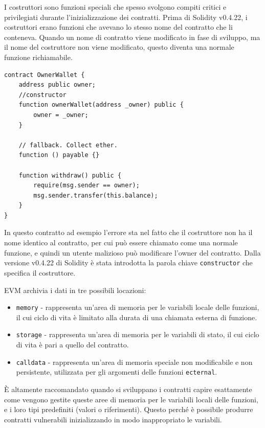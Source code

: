 I costruttori sono funzioni speciali che spesso svolgono compiti critici e privilegiati durante l'inizializzazione dei contratti. Prima di Solidity v0.4.22, i costruttori erano funzioni che avevano lo stesso nome del contratto che li conteneva. Quando un nome di contratto viene modificato in fase di sviluppo, ma il nome del costruttore non viene modificato, questo diventa una normale funzione richiamabile.
\begin{lstlisting}
contract OwnerWallet {
    address public owner;
    //constructor
    function ownerWallet(address _owner) public {
        owner = _owner;
    }
    
    // fallback. Collect ether.
    function () payable {} 
    
    function withdraw() public {
        require(msg.sender == owner); 
        msg.sender.transfer(this.balance);
    }
}
\end{lstlisting}
In questo contratto ad esempio l'errore sta nel fatto che il costruttore non ha il nome identico al contratto, per cui può essere chiamato come una normale funzione, e quindi un utente malizioso può modificare l'owner del contratto. Dalla versione v0.4.22 di Solidity è stata introdotta la parola chiave \texttt{constructor} che specifica il costruttore. 

\vspace{5mm}

EVM archivia i dati in tre possibili locazioni:
\begin{itemize}
    \item \texttt{memory} - rappresenta un'area di memoria per le variabili locale delle funzioni, il cui ciclo di vita è limitato alla durata di una chiamata esterna di funzione.
    \item \texttt{storage} - rappresenta un'area di memoria per le variabili di stato, il cui ciclo di vita è pari a quello del contratto.
    \item \texttt{calldata} - rappresenta un'area di memoria speciale non modificabile e non persistente, utilizzata per gli argomenti delle funzioni \texttt{ecternal}.
\end{itemize}
È altamente raccomandato quando si sviluppano i contratti capire esattamente come vengono gestite queste aree di memoria per le variabili locali delle funzioni, e i loro tipi predefiniti (valori o riferimenti). Questo perché è possibile produrre contratti vulnerabili inizializzando in modo inappropriato le variabili. 

